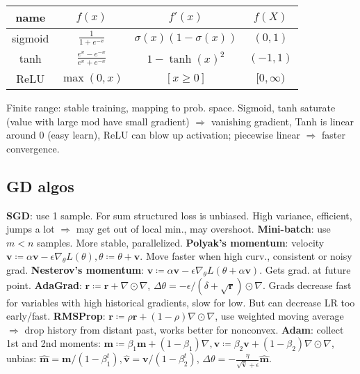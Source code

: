 \documentclass[11pt,landscape,a4paper,fleqn]{article}
\def\myvector#1{\mathbf{#1}}
\def\vm{{\myvector{m}}}
\def\vr{{\myvector{r}}}
\def\vv{{\myvector{v}}}
\begin{document}
\begin{multicols*}{4}
\begin{tabular}[]{@{}c@{}ccc@{}}
    \toprule
    name & $f(x)$ & $f'(x)$ & $f(X)$ \\
    \midrule
    sigmoid & $\frac{1}{1 + e^{-x}}$ & $\sigma(x)(1 - \sigma(x))$ & $(0, 1)$ \\
    tanh & $\frac{e^x - e^{-x}}{e^x + e^{-x}}$ & $1 - \tanh(x)^2$ & $( - 1, 1)$ \\
    ReLU & $\max(0, x)$ & $[x \geq 0]$ & $[0, \infty)$ \\
\end{tabular}
Finite range: stable training, mapping to prob. space.
Sigmoid, tanh saturate (value with large mod have small gradient) $ \Rightarrow $ vanishing gradient,
Tanh is linear around 0 (easy learn),
ReLU can blow up activation; piecewise linear $ \Rightarrow $ faster convergence.

\subsection{GD algos}

\textbf{SGD}: use 1 sample.
For sum structured loss is unbiased.
High variance, efficient, jumps a lot $ \Rightarrow $ may get out of local min.,
may overshoot.
\textbf{Mini-batch}: use $m < n$ samples.
More stable, parallelized.
\textbf{Polyak's momentum}: velocity $\vv \coloneqq \alpha \vv - \epsilon \nabla_\theta L(\theta), \theta \coloneqq \theta + \vv$.
Move faster when high curv., consistent or noisy grad.
\textbf{Nesterov's momentum}: $\vv \coloneqq \alpha \vv - \epsilon \nabla_\theta L(\theta + \alpha \vv)$.
Gets grad. at future point.
\textbf{AdaGrad}: $\vr \coloneqq \vr + \nabla \odot \nabla$, $\Delta \theta = - \epsilon / (\delta + \sqrt{\vr})
\odot \nabla$.
Grads decrease fast for variables with high historical gradients,
slow for low. But can decrease LR too early/fast.
\textbf{RMSProp}: $\vr \coloneqq \rho \vr + (1 - \rho) \nabla \odot \nabla$,
use weighted moving average $ \Rightarrow $ drop history from distant past,
works better for nonconvex.
\textbf{Adam}: collect 1st and 2nd moments:
$\vm \coloneqq \beta_1 \vm + (1 - \beta_1) \nabla, \vv \coloneqq \beta_2 \vv + (1 - \beta_2) \nabla \odot \nabla$,
unbias:
$\hat{\vm} = \vm / (1 - \beta_1^t), \hat{\vv} = \vv / (1 - \beta_2^t)$,
$\Delta \theta =- \frac{\eta}{\sqrt{\hat{\vv}} + \epsilon}\hat{\vm}$.



\end{multicols*}
\end{document}

